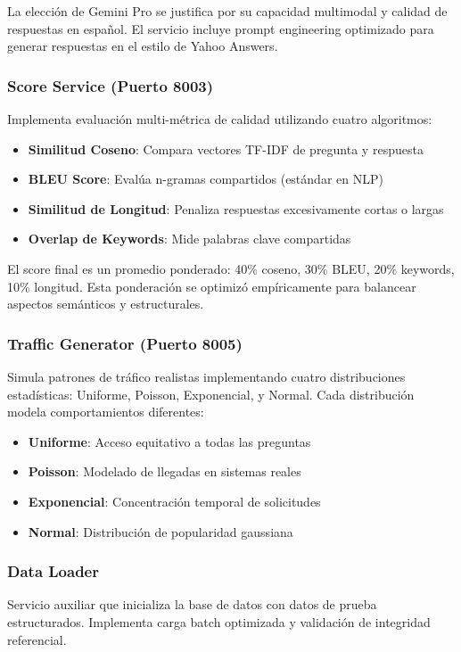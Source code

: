 \documentclass[12pt,a4paper]{article}
\begin{document}
La elección de Gemini Pro se justifica por su capacidad multimodal y calidad de respuestas en español. El servicio incluye prompt engineering optimizado para generar respuestas en el estilo de Yahoo Answers.

\subsubsection{Score Service (Puerto 8003)}
Implementa evaluación multi-métrica de calidad utilizando cuatro algoritmos:

\begin{itemize}
\item \textbf{Similitud Coseno}: Compara vectores TF-IDF de pregunta y respuesta
\item \textbf{BLEU Score}: Evalúa n-gramas compartidos (estándar en NLP)
\item \textbf{Similitud de Longitud}: Penaliza respuestas excesivamente cortas o largas  
\item \textbf{Overlap de Keywords}: Mide palabras clave compartidas
\end{itemize}

El score final es un promedio ponderado: 40\% coseno, 30\% BLEU, 20\% keywords, 10\% longitud. Esta ponderación se optimizó empíricamente para balancear aspectos semánticos y estructurales.

\subsubsection{Traffic Generator (Puerto 8005)}
Simula patrones de tráfico realistas implementando cuatro distribuciones estadísticas: Uniforme, Poisson, Exponencial, y Normal. Cada distribución modela comportamientos diferentes:

\begin{itemize}
\item \textbf{Uniforme}: Acceso equitativo a todas las preguntas
\item \textbf{Poisson}: Modelado de llegadas en sistemas reales
\item \textbf{Exponencial}: Concentración temporal de solicitudes
\item \textbf{Normal}: Distribución de popularidad gaussiana
\end{itemize}

\subsubsection{Data Loader}
Servicio auxiliar que inicializa la base de datos con datos de prueba estructurados. Implementa carga batch optimizada y validación de integridad referencial.
\end{document}
